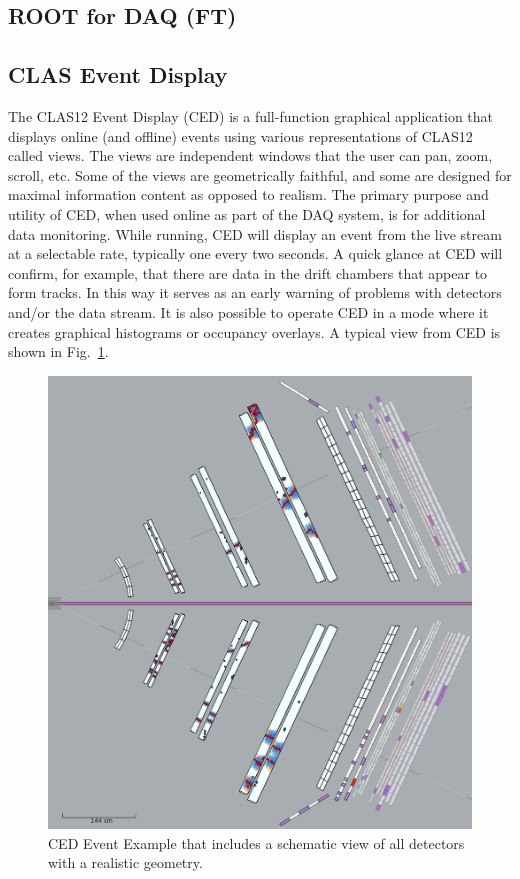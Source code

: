 \subsection{ROOT for DAQ (FT)}




\subsection{CLAS Event Display}

The CLAS12 Event Display (CED) is a full-function graphical application that displays online (and offline) events using various representations of CLAS12 called views. The views are independent windows that the user can pan, zoom, scroll, etc. Some of the views are geometrically faithful, and some are designed for maximal information content as opposed to realism. The primary purpose and utility of CED, when used online as part of the DAQ system, is for additional data monitoring. While running, CED will display an event from the live stream at a selectable rate, typically one every two seconds. A quick glance at CED will confirm, for example, that there are data in the drift chambers that appear to form tracks. In this way it serves as an early warning of problems with detectors and/or the data stream. It is also possible to operate CED in a mode where it creates graphical histograms or occupancy overlays. A typical view from CED is shown in Fig.~\ref{fig:ced}.

\begin{figure}[hbt]
	\centering
	\includegraphics[width=1.0\columnwidth,keepaspectratio]{img/ced.png}
	\caption{CED Event Example that includes a schematic view of all detectors with a realistic geometry.}
	\label{fig:ced}
\end{figure}

